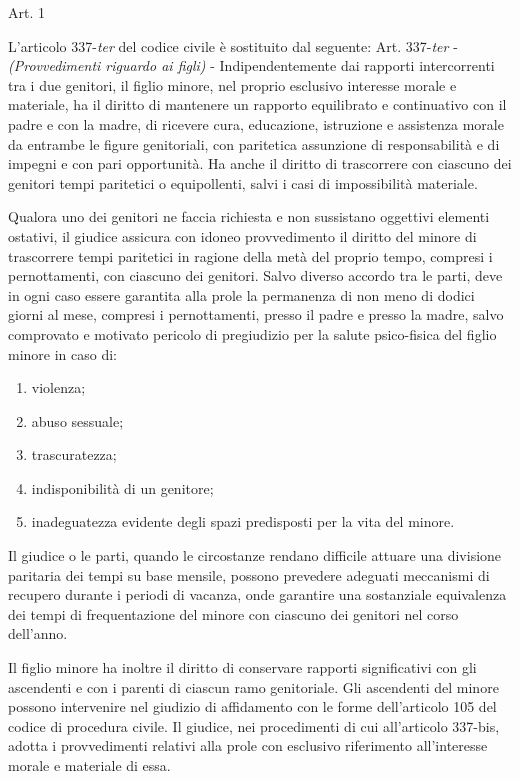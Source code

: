 \documentclass[twocolumn,12pt]{article}
\begin{document}
\begin{center}
    Art. 1
\end{center}

L'articolo 337-\emph{ter} del codice civile è sostituito dal seguente:
\bigbreak
\guillemotleft Art. 337-\emph{ter} - \emph{(Provvedimenti riguardo ai figli)} -
Indipendentemente dai rapporti
intercorrenti tra i due genitori, il figlio minore, nel proprio esclusivo interesse morale
e materiale, ha il diritto di mantenere un
rapporto equilibrato e continuativo con il padre e con la madre, di ricevere cura, educazione, istruzione e assistenza morale da entrambe le figure genitoriali, con paritetica
assunzione di responsabilità e di impegni e
con pari opportunità. Ha anche il diritto di
trascorrere con ciascuno dei genitori tempi
paritetici o equipollenti, salvi i casi di impossibilità materiale.

Qualora uno dei genitori ne faccia richiesta e non sussistano oggettivi elementi ostativi, il giudice assicura con idoneo provvedimento il diritto del minore di trascorrere
tempi paritetici in ragione della metà del
proprio tempo, compresi i pernottamenti,
con ciascuno dei genitori. Salvo diverso accordo tra le parti, deve in ogni caso essere
garantita alla prole la permanenza di non
meno di dodici giorni al mese, compresi i
pernottamenti, presso il padre e presso la
madre, salvo comprovato e motivato pericolo di pregiudizio per la salute psico-fisica
del figlio minore in caso di:
\begin{enumerate}[topsep=0pt,itemsep=-1ex,partopsep=1ex,parsep=1ex]
\item violenza;
\item abuso sessuale;
\item trascuratezza;
\item indisponibilità di un genitore;
\item inadeguatezza evidente degli spazi predisposti per la vita del minore.
\end{enumerate}
\bigbreak
\indent Il giudice o le parti, quando le circostanze
rendano difficile attuare una divisione paritaria dei tempi su base mensile, possono
prevedere adeguati meccanismi di recupero
durante i periodi di vacanza, onde garantire
una sostanziale equivalenza dei tempi di frequentazione del minore con ciascuno dei genitori nel corso dell’anno.

Il figlio minore ha inoltre il diritto di conservare rapporti significativi con gli ascendenti e con i parenti di ciascun ramo genitoriale. Gli ascendenti del minore possono
intervenire nel giudizio di affidamento con
le forme dell’articolo 105 del codice di procedura civile. Il giudice, nei procedimenti di
cui all’articolo 337-bis, adotta i provvedimenti relativi alla prole con esclusivo riferimento all’interesse morale e materiale di
essa.
\end{document}
